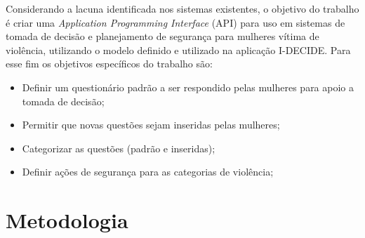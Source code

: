 Considerando a lacuna identificada nos sistemas existentes, o objetivo do trabalho é 
criar uma \textit{Application Programming Interface} (API) para uso em sistemas de tomada de 
decisão e planejamento de segurança para mulheres vítima de violência, utilizando o modelo definido e utilizado na aplicação I-DECIDE.
Para esse fim os objetivos específicos do trabalho são:
\begin{itemize}
	\item Definir um questionário padrão a ser respondido pelas mulheres para apoio a tomada de decisão;
	\item Permitir que novas questões sejam inseridas pelas mulheres;
	\item Categorizar as questões (padrão e inseridas);
	\item Definir ações de segurança para as categorias de violência;
\end{itemize}

\section{Metodologia}







